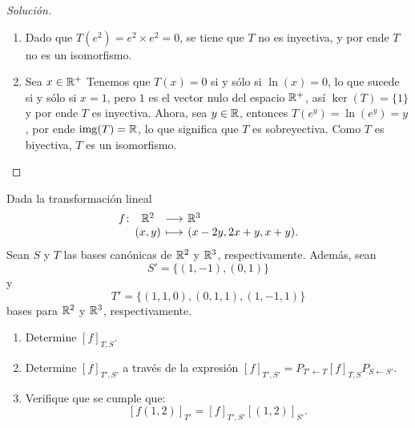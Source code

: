 \documentclass[a4,11pt]{aleph-notas}
\begin{document}
\begin{proof}[Solución]
\begin{enumerate}
        \item Dado que $T(e^2) = e^2\times e^2 = 0$, se tiene que $T$ no es inyectiva, y por ende $T$ no es un isomorfismo.
        \item Sea $x\in\mathbb{R}^+$ Tenemos que $T(x)=0$ si y sólo si $\ln(x)=0$, lo que sucede si y sólo si $x=1$, pero $1$ es el vector nulo del espacio $\mathbb{R}^+$, así $\ker(T)=\{1\}$ y por ende $T$ es inyectiva. Ahora, sea $y\in\mathbb{R}$, entonces $T(e^y) = \ln(e^y) = y$, por ende $\operatorname{img}(T)=\mathbb{R}$, lo que significa que $T$ es sobreyectiva. Como $T$ es biyectiva, $T$ es un isomorfismo.
    \end{enumerate}
\end{proof}

\begin{ejer}
    Dada la transformación lineal
    \[
        \funcion{f}{\R^{2}}{\R^{3}}{(x,y)}{(x-2y,2x+y,x+y).}
    \]
    Sean $S$ y $T$ las bases canónicas de $\mathbb{R}^{2}$ y $\mathbb{R}^{3}$, respectivamente. Además, sean 
    \[
        S' = \{(1, -1),(0, 1)\}
    \] 
    y
    \[
        T' = \{(1,1,0), (0,1,1), (1,-1,1)\}
    \]
    bases para $\mathbb{R}^{2}$ y $\mathbb{R}^{3}$, respectivamente.
    \begin{enumerate}
        \item Determine $[f]_{T,S}$. %
        \item Determine $[f]_{T',S'}$ a través de la expresión $[f]_{T',S'} = P_{T'\leftarrow T} [f]_{T,S} P_{S\leftarrow S'}$.
        \item Verifique que se cumple que:
        \[
            [f(1,2)]_{T'} = [f]_{T',S'}[(1,2)]_{S'}.
        \]
    \end{enumerate}
\end{ejer}
\end{document}
